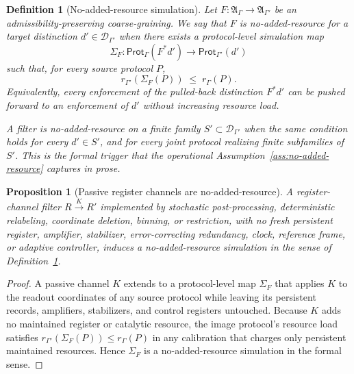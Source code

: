 \documentclass[11pt]{article}
\newtheorem{proposition}[theorem]{Proposition}
\newtheorem{definition}[theorem]{Definition}
\newcommand{\A}{\mathfrak A}
\begin{document}
\begin{definition}[No-added-resource simulation]\label{def:no-added-resource-simulation}
Let $F:\A_\Gamma\to\A_{\Gamma'}$ be an admissibility-preserving
coarse-graining.  We say that $F$ is \emph{no-added-resource} for a
target distinction $d'\in\mathcal D_{\Gamma'}$ when there exists a
protocol-level simulation map
\[
    \Sigma_F:\mathsf{Prot}_\Gamma(F^*d')
    \longrightarrow
    \mathsf{Prot}_{\Gamma'}(d')
\]
such that, for every source protocol $P$,
\[
    r_{\Gamma'}(\Sigma_F(P)) \;\le\; r_\Gamma(P).
\]
Equivalently, every enforcement of the pulled-back distinction $F^*d'$
can be pushed forward to an enforcement of $d'$ without increasing
resource load.

A filter is no-added-resource on a finite family
$S'\subset\mathcal D_{\Gamma'}$ when the same condition holds for every
$d'\in S'$, and for every joint protocol realizing finite subfamilies
of $S'$.  This is the formal trigger that the operational
Assumption~\ref{ass:no-added-resource} captures in prose.
\end{definition}

\begin{proposition}[Passive register channels are no-added-resource]\label{prop:register-channels-no-added-resource-formal}
A register-channel filter $R\xrightarrow{K}R'$ implemented by stochastic
post-processing, deterministic relabeling, coordinate deletion, binning,
or restriction, with no fresh persistent register, amplifier,
stabilizer, error-correcting redundancy, clock, reference frame, or
adaptive controller, induces a no-added-resource simulation in the
sense of Definition~\ref{def:no-added-resource-simulation}.
\end{proposition}
\begin{proof}
A passive channel $K$ extends to a protocol-level map $\Sigma_F$ that
applies $K$ to the readout coordinates of any source protocol while
leaving its persistent records, amplifiers, stabilizers, and control
registers untouched.  Because $K$ adds no maintained register or
catalytic resource, the image protocol's resource load satisfies
$r_{\Gamma'}(\Sigma_F(P)) \le r_\Gamma(P)$ in any calibration that
charges only persistent maintained resources.  Hence $\Sigma_F$ is a
no-added-resource simulation in the formal sense.
\end{proof}
\end{document}
